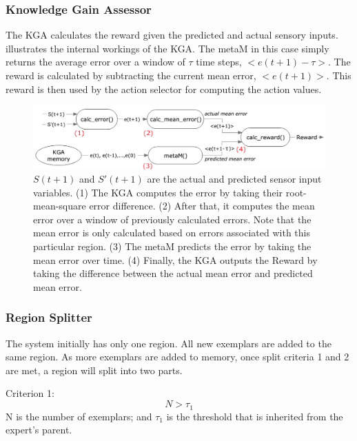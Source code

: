 \subsubsection{Knowledge Gain Assessor}

The KGA calculates the reward given the predicted and actual sensory inputs.  illustrates the internal workings of the KGA. The metaM in this case simply returns the average error over a window of $\tau$ time steps, $<e(t+1)-\tau>$. The reward is calculated by subtracting the current mean error, $<e(t+1)>$. This reward is then used by the action selector for computing the action values. 

\begin{figure}[htbp]
	\centering
	\includegraphics[width=1.0 \textwidth]{"fig/cbla/Block Diagram KGA"}
	\caption[Block diagram of the Knowledge Gain Assessor]{$S(t+1)$ and $S'(t+1)$ are the actual and predicted sensor input variables. (1) The KGA computes the error by taking their root-mean-square error difference. (2) After that, it computes the mean error over a window of previously calculated errors. Note that the mean error is only calculated based on errors associated with this particular region. (3) The metaM predicts the error by taking the mean error over time. (4) Finally, the KGA outputs the Reward by taking the difference between the actual mean error and predicted mean error. }
	\label{fig:Block Diagram KGA}
\end{figure}

\FloatBarrier
\subsubsection{Region Splitter}

The system initially has only one region. All new exemplars are added to the same region. As more exemplars are added to memory, once split criteria 1 and 2 are met, a region will split into two parts.

Criterion 1: 
\begin{equation}\label{eqn:split-criterion1}
	N>\tau_1
\end{equation}
N is the number of exemplars; and $\tau_1$ is the threshold that is inherited from the expert's parent. 

